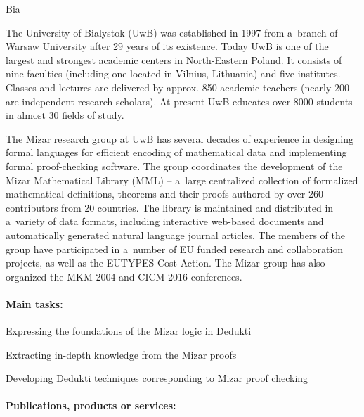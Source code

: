 \begin{sitedescription}{Bia}



The University of Bialystok (UwB) was established in 1997 from a~branch of Warsaw University after 29 years of its existence.
Today UwB is one of the largest and strongest academic centers in North-Eastern Poland.
It consists of nine faculties (including one located in Vilnius, Lithuania) and five institutes.
Classes and lectures are delivered by approx. 850 academic teachers (nearly 200 are independent research scholars).
At present UwB educates over 8000 students in almost 30 fields of study.

The Mizar research group at UwB has several decades of experience in designing formal languages 
for efficient encoding of mathematical data and implementing formal proof-checking software.
The group coordinates the development of the Mizar Mathematical Library (MML) -- 
a~large centralized collection of formalized mathematical definitions, theorems and their proofs 
authored by over 260 contributors from 20 countries.
The library is maintained and distributed in a~variety of data formats, 
including interactive web-based documents and automatically generated natural language journal articles. 
The members of the group have participated in a~number of EU funded research
and collaboration projects,
as well as the EUTYPES Cost Action.
The Mizar group has also organized the MKM 2004 and CICM 2016 conferences.

\paragraph*{Main tasks:}

\begin{compactitem}
\item Expressing the foundations of the Mizar logic in Dedukti 
\item Extracting in-depth knowledge from the Mizar proofs 
\item Developing Dedukti techniques corresponding to Mizar proof checking 
\end{compactitem}

\paragraph*{Publications, products or services:}


\end{sitedescription}
